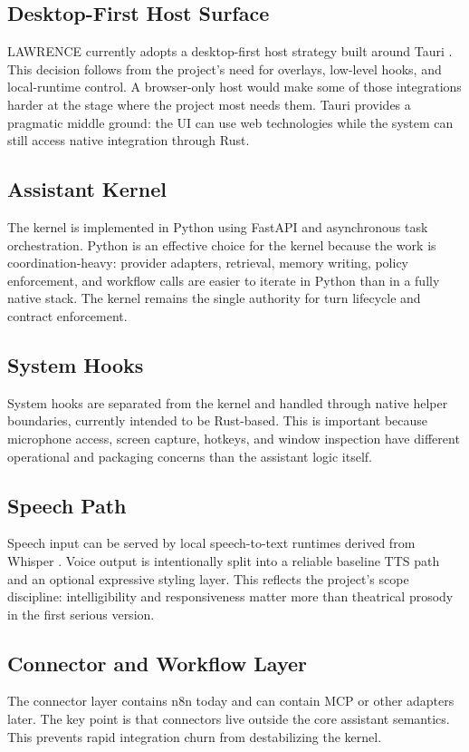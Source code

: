 \documentclass[conference]{IEEEtran}
\begin{document}
\subsection{Desktop-First Host Surface}
LAWRENCE currently adopts a desktop-first host strategy built around Tauri \cite{tauri}. This decision follows from the project's need for overlays, low-level hooks, and local-runtime control. A browser-only host would make some of those integrations harder at the stage where the project most needs them. Tauri provides a pragmatic middle ground: the UI can use web technologies while the system can still access native integration through Rust.

\subsection{Assistant Kernel}
The kernel is implemented in Python using FastAPI and asynchronous task orchestration. Python is an effective choice for the kernel because the work is coordination-heavy: provider adapters, retrieval, memory writing, policy enforcement, and workflow calls are easier to iterate in Python than in a fully native stack. The kernel remains the single authority for turn lifecycle and contract enforcement.

\subsection{System Hooks}
System hooks are separated from the kernel and handled through native helper boundaries, currently intended to be Rust-based. This is important because microphone access, screen capture, hotkeys, and window inspection have different operational and packaging concerns than the assistant logic itself.

\subsection{Speech Path}
Speech input can be served by local speech-to-text runtimes derived from Whisper \cite{radford2022whisper}. Voice output is intentionally split into a reliable baseline TTS path and an optional expressive styling layer. This reflects the project's scope discipline: intelligibility and responsiveness matter more than theatrical prosody in the first serious version.

\subsection{Connector and Workflow Layer}
The connector layer contains n8n today and can contain MCP or other adapters later. The key point is that connectors live outside the core assistant semantics. This prevents rapid integration churn from destabilizing the kernel.
\end{document}
